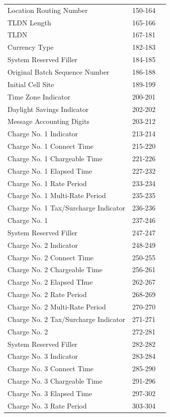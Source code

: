 \documentclass[12pt,twoside]{article}
\begin{document}
\begin{longtable}{l|l|l}
Location Routing Number & 150-164 & \\
TLDN Length & 165-166 & \\
TLDN & 167-181 & \\
Currency Type & 182-183 & \\
System Reserved Filler & 184-185 & \\
Original Batch Sequence Number & 186-188 & \\
Initial Cell Site & 189-199 & \\
Time Zone Indicator & 200-201 & \\
Daylight Savings Indicator & 202-202 & \\
Message Accounting Digits & 203-212 & \\
Charge No. 1 Indicator & 213-214 & \\
Charge No. 1 Connect Time & 215-220 & \\
Charge No. 1 Chargeable Time & 221-226 & \\
Charge No. 1 Elapsed Time & 227-232 & \\
Charge No. 1 Rate Period & 233-234 & \\
Charge No. 1 Multi-Rate Period & 235-235 & \\
Charge No. 1 Tax/Surcharge Indicator & 236-236 & \\
Charge No. 1 & 237-246 & \\
System Reserved Filler & 247-247 & \\
Charge No. 2 Indicator & 248-249 & \\
Charge No. 2 Connect Time & 250-255 & \\
Charge No. 2 Chargeable Time & 256-261 & \\
Charge No. 2 Elapsed TIme & 262-267 & \\
Charge No. 2 Rate Period & 268-269 & \\
Charge No. 2 Multi-Rate Period & 270-270 & \\
Charge No. 2 Tax/Surcharge Indicator & 271-271 & \\
Charge No. 2 & 272-281 & \\
System Reserved Filler & 282-282 & \\
Charge No. 3 Indicator & 283-284 & \\
Charge No. 3 Connect Time & 285-290 & \\
Charge No. 3 Chargeable Time & 291-296 & \\
Charge No. 3 Elapsed Time & 297-302 & \\
Charge No. 3 Rate Period & 303-304 & \\

\end{longtable}
\end{document}
